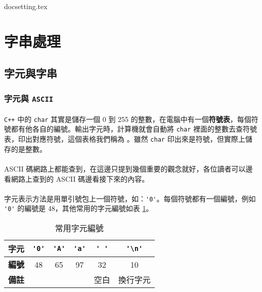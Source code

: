 \documentclass[12pt,a4paper,oneside]{article}
\begin{document}
\begin{CJK}{UTF8}{bkai}

{docsetting.tex}
\setcounter{section}{2}

\fi

\section{字串處理}

\subsection{字元與字串}

\subsubsection{字元與 \texttt{ASCII}}

\paragraph{}\texttt{C++} 中的 \lstinline!char! 其實是儲存一個 0 到 255 的整數，在電腦中有一個\textbf{符號表}，每個符號都有他各自的編號。輸出字元時，計算機就會自動將 \lstinline!char! 裡面的整數去查符號表，印出對應符號，這個表格我們稱為 。雖然 \lstinline!char! 印出來是符號，但實際上儲存的是整數。
\paragraph{}ASCII 碼網路上都能查到，在這邊只提到幾個重要的觀念就好，各位讀者可以邊看網路上查到的 ASCII 碼邊看接下來的內容。
\paragraph{}字元表示方法是用單引號包上一個符號，如：\lstinline!'0'!。每個符號都有一個編號，例如 \lstinline!'0'! 的編號是 48，其他常用的字元編號如表 \ref{string:mani:table:char:ascii}。

\begin{table}[h!]
  \centering
  \begin{tabular}{|c||c|c|c|c|c|}
  \hline
  \textbf{字元} & \lstinline!'0'! & \lstinline!'A'! & \lstinline!'a'! & \lstinline!' '! & \lstinline!'\n'!\\
  \hline
  \textbf{編號} & 48 & 65 & 97 & 32 & 10\\
  \hline
  \textbf{備註} & & & & 空白 & 換行字元\\
  \hline
  \end{tabular}
  \caption{常用字元編號}
  \label{string:mani:table:char:ascii}
\end{table}


\end{CJK}
\end{document}
